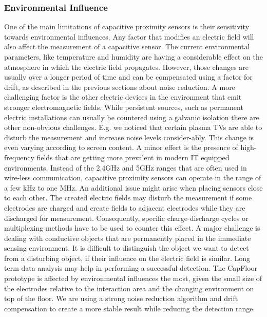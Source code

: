 \subsubsection{Environmental Influence}
One of the main limitations of capacitive proximity sensors is their sensitivity towards environmental influences. Any factor that modifies an electric field will also affect the measurement of a capacitive sensor. The current environmental parameters, like temperature and humidity are having a considerable effect on the atmosphere in which the electric field propagates. However, those changes are usually over a longer period of time and can be compensated using a factor for drift, as described in the previous sections about noise reduction. A more challenging factor is the other electric devices in the environment that emit stronger electromagnetic fields. While persistent sources, such as permanent electric installations can usually be countered using a galvanic isolation there are other non-obvious challenges. E.g. we noticed that certain plasma TVs are able to disturb the measurement and increase noise levels consider-ably. This change is even varying according to screen content. A minor effect is the presence of high-frequency fields that are getting more prevalent in modern IT equipped environments. Instead of the 2.4GHz and 5GHz ranges that are often used in wire-less communication, capacitive proximity sensors can operate in the range of a few kHz to one MHz. 
An additional issue might arise when placing sensors close to each other. The created electric fields may disturb the measurement if some electrodes are charged and create fields to adjacent electrodes while they are discharged for measurement. Consequently, specific charge-discharge cycles or multiplexing methods have to be used to counter this effect. 
A major challenge is dealing with conductive objects that are permanently placed in the immediate sensing environment. It is difficult to distinguish the object we want to detect from a disturbing object, if their influence on the electric field is similar. Long term data analysis may help in performing a successful detection.
The CapFloor prototype is affected by environmental influences the most, given the small size of the electrodes relative to the interaction area and the changing environment on top of the floor. We are using a strong noise reduction algorithm and drift compensation to create a more stable result while reducing the detection range.
